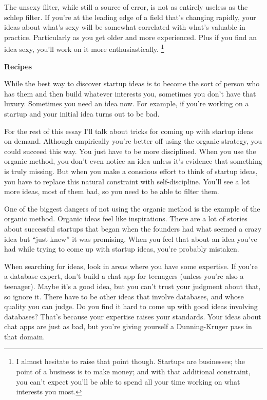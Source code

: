 The unsexy filter, while still a source of error, is not as entirely
useless as the schlep filter. If you're at the leading edge of a field
that's changing rapidly, your ideas about what's sexy will be somewhat
correlated with what's valuable in practice. Particularly as you get
older and more experienced. Plus if you find an idea sexy, you'll work
on it more enthusiastically. \footnote{I almost hesitate to raise that point though. Startups are
businesses; the point of a business is to make money; and with that
additional constraint, you can't expect you'll be able to spend all your
time working on what interests you most.}

\textbf{Recipes}

While the best way to discover startup ideas is to become the sort of
person who has them and then build whatever interests you, sometimes you
don't have that luxury. Sometimes you need an idea now. For example, if
you're working on a startup and your initial idea turns out to be bad.

For the rest of this essay I'll talk about tricks for coming up with
startup ideas on demand. Although empirically you're better off using
the organic strategy, you could succeed this way. You just have to be
more disciplined. When you use the organic method, you don't even notice
an idea unless it's evidence that something is truly missing. But when
you make a conscious effort to think of startup ideas, you have to
replace this natural constraint with self-discipline. You'll see a lot
more ideas, most of them bad, so you need to be able to filter them.

One of the biggest dangers of not using the organic method is the
example of the organic method. Organic ideas feel like inspirations.
There are a lot of stories about successful startups that began when the
founders had what seemed a crazy idea but ``just knew'' it was
promising. When you feel that about an idea you've had while trying to
come up with startup ideas, you're probably mistaken.

When searching for ideas, look in areas where you have some expertise.
If you're a database expert, don't build a chat app for teenagers
(unless you're also a teenager). Maybe it's a good idea, but you can't
trust your judgment about that, so ignore it. There have to be other
ideas that involve databases, and whose quality you can judge. Do you
find it hard to come up with good ideas involving databases? That's
because your expertise raises your standards. Your ideas about chat apps
are just as bad, but you're giving yourself a Dunning-Kruger pass in
that domain.

